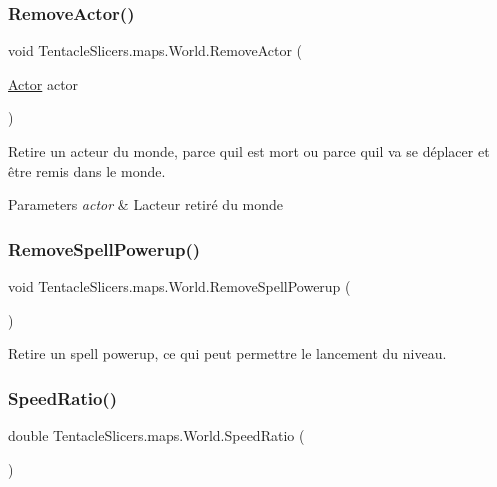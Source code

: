 \subsubsection{\texorpdfstring{Remove\+Actor()}{RemoveActor()}}
{\footnotesize\ttfamily void Tentacle\+Slicers.\+maps.\+World.\+Remove\+Actor (\begin{DoxyParamCaption}\item[{\hyperlink{class_tentacle_slicers_1_1actors_1_1_actor}{Actor}}]{actor }\end{DoxyParamCaption})}



Retire un acteur du monde, parce qu\textquotesingle{}il est mort ou parce qu\textquotesingle{}il va se déplacer et être remis dans le monde. 


\begin{DoxyParams}{Parameters}
{\em actor} & L\textquotesingle{}acteur retiré du monde \\
\hline
\end{DoxyParams}
\mbox{\label{class_tentacle_slicers_1_1maps_1_1_world_aa9e6e80fc271c36e2aa38524b40faa8f}} 
\subsubsection{\texorpdfstring{Remove\+Spell\+Powerup()}{RemoveSpellPowerup()}}
{\footnotesize\ttfamily void Tentacle\+Slicers.\+maps.\+World.\+Remove\+Spell\+Powerup (\begin{DoxyParamCaption}{ }\end{DoxyParamCaption})}



Retire un spell powerup, ce qui peut permettre le lancement du niveau. 

\mbox{\label{class_tentacle_slicers_1_1maps_1_1_world_a383fb2d74c13c7b775077bc40ace811c}} 
\subsubsection{\texorpdfstring{Speed\+Ratio()}{SpeedRatio()}}
{\footnotesize\ttfamily double Tentacle\+Slicers.\+maps.\+World.\+Speed\+Ratio (\begin{DoxyParamCaption}{ }\end{DoxyParamCaption})}



